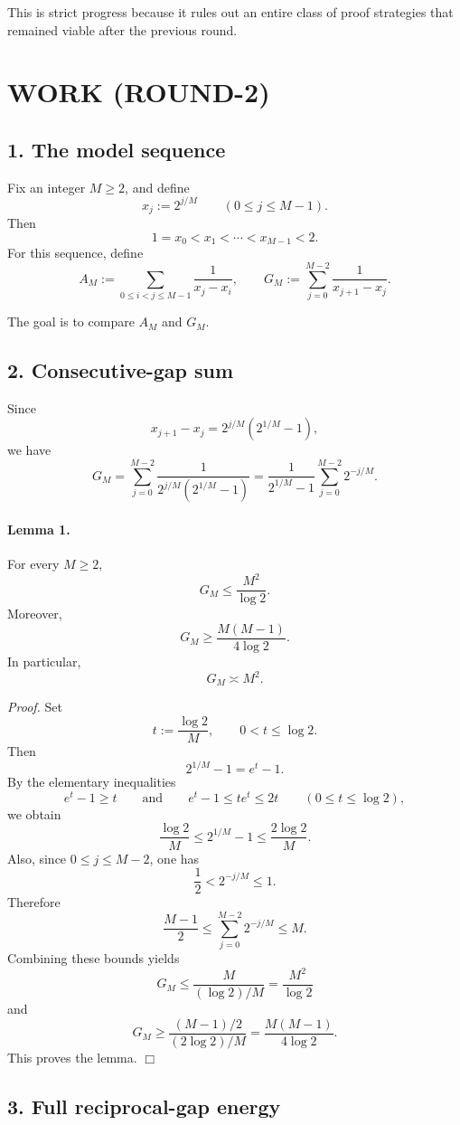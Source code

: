 This is strict progress because it rules out an entire class of proof strategies that remained viable after the previous round.

\section{WORK (ROUND-2)}

\subsection*{1. The model sequence}

Fix an integer \(M\ge 2\), and define
\[
x_j:=2^{j/M}\qquad (0\le j\le M-1).
\]
Then
\[
1=x_0<x_1<\cdots <x_{M-1}<2.
\]
For this sequence, define
\[
A_M:=\sum_{0\le i<j\le M-1}\frac{1}{x_j-x_i},
\qquad
G_M:=\sum_{j=0}^{M-2}\frac{1}{x_{j+1}-x_j}.
\]

The goal is to compare \(A_M\) and \(G_M\).

\subsection*{2. Consecutive-gap sum}

Since
\[
x_{j+1}-x_j=2^{j/M}(2^{1/M}-1),
\]
we have
\[
G_M
=\sum_{j=0}^{M-2}\frac{1}{2^{j/M}(2^{1/M}-1)}
=\frac{1}{2^{1/M}-1}\sum_{j=0}^{M-2}2^{-j/M}.
\]

\paragraph{Lemma 1.}
For every \(M\ge 2\),
\[
G_M\le \frac{M^2}{\log 2}.
\]
Moreover,
\[
G_M\ge \frac{M(M-1)}{4\log 2}.
\]
In particular,
\[
G_M\asymp M^2.
\]

\emph{Proof.}
Set
\[
t:=\frac{\log 2}{M},
\qquad 0<t\le \log 2.
\]
Then
\[
2^{1/M}-1=e^t-1.
\]
By the elementary inequalities
\[
e^t-1\ge t
\qquad\text{and}\qquad
e^t-1\le te^t\le 2t
\qquad (0\le t\le \log 2),
\]
we obtain
\[
\frac{\log 2}{M}\le 2^{1/M}-1\le \frac{2\log 2}{M}.
\]
Also, since \(0\le j\le M-2\), one has
\[
\frac12<2^{-j/M}\le 1.
\]
Therefore
\[
\frac{M-1}{2}\le \sum_{j=0}^{M-2}2^{-j/M}\le M.
\]
Combining these bounds yields
\[
G_M
\le \frac{M}{(\log 2)/M}=\frac{M^2}{\log 2}
\]
and
\[
G_M
\ge \frac{(M-1)/2}{(2\log 2)/M}
=\frac{M(M-1)}{4\log 2}.
\]
This proves the lemma.
\hfill\(\Box\)

\subsection*{3. Full reciprocal-gap energy}


